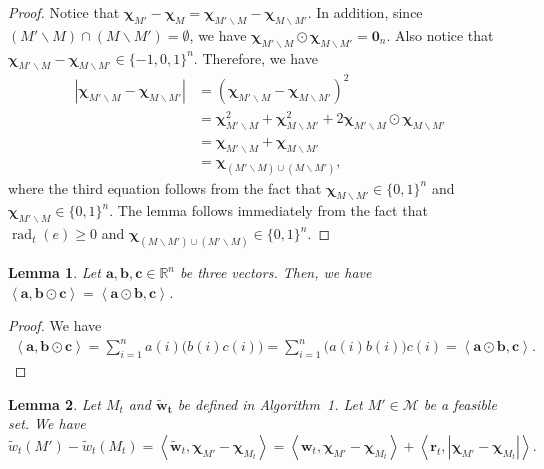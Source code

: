 \documentclass{article}
\newtheorem{lemma}{Lemma}
\newcommand{\M}{\mathcal M}
\newcommand{\del}{\backslash}
\newcommand{\RR}{\mathbb R}
\DeclareMathOperator{\rad}{rad}
\newcommand{\inn}[1]{\left\langle #1 \right\rangle}
\renewcommand{\vec}[1]{\boldsymbol{#1}}
\begin{document}
\begin{spacing}{1.1}
\begin{proof}
Notice that $\vec\chi_{M'}-\vec\chi_{M} = \vec\chi_{M'\del M}-\vec\chi_{M\del M'}$.
In addition, since $(M'\del M) \cap (M\del M') = \emptyset$, we have
$\vec \chi_{M'\del M} \odot \vec\chi_{M\del M'} = \vec 0_n$. 
Also notice that $ \vec\chi_{M'\del M}-\vec\chi_{M\del M'} \in \{-1,0,1\}^n$.
Therefore, we have
\begin{align*}
|\vec\chi_{M'\del M}-\vec\chi_{M\del M'}| 
&= (\vec\chi_{M'\del M}-\vec\chi_{M\del M'})^2\\
&=\vec\chi_{M'\del M}^2+\vec\chi_{M\del M'}^2+2\vec \chi_{M'\del M} \odot \vec\chi_{M\del M'} \\
&=\vec\chi_{M'\del M}+\vec\chi_{M\del M'}\\
& = \vec\chi_{(M' \del M) \cup (M\del M')},
\end{align*}
where the third equation follows from the fact that $\vec\chi_{M\del M'}\in \{0,1\}^n$ and $\vec\chi_{M'\del M}\in\{0,1\}^n$.
The lemma follows immediately from the fact that $\rad_t(e) \ge 0$ and  $\vec\chi_{(M\del M')\cup(M'\del M)}\in \{0,1\}^n$.
\end{proof}

\begin{lemma}
\label{lemma:vector-technical}
Let $\vec a,\vec b, \vec c \in \RR^n$ be three vectors.
Then, we have $\inn{\vec a, \vec b\odot \vec c} = \inn{\vec a\odot \vec b,\vec c}$.
\end{lemma}

\begin{proof}
We have
\begin{align*}
	\inn{\vec a,\vec b\odot \vec c} = \sum_{i=1}^n a(i) \big(b(i) c(i)\big) = \sum_{i=1}^n \big(a(i)b(i)\big)c(i) = \inn{\vec a\odot\vec b,\vec c}.
\end{align*}
\end{proof}

\begin{lemma}
Let $M_t$ and $\vec{\tilde w_t}$ be defined in Algorithm~1. 
Let $M' \in \M$ be a feasible set.
We have
$$
\tilde w_t(M')-\tilde w_t(M_t) = 
\inn{\vec{\tilde w}_t, \vec \chi_{M'}-\vec \chi_{M_t}} = \inn{\vec w_t, \vec \chi_{M'}-\vec\chi_{M_t}}+\inn{\vec r_t, |\vec \chi_{M'}-\vec\chi_{M_t}|}.
$$
\label{lemma:tilde}
\end{lemma}


\end{spacing}
\end{document}

